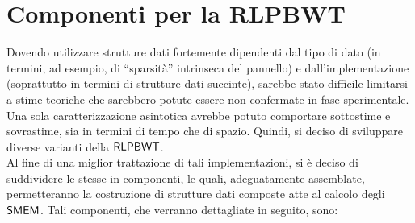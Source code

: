 \section{Componenti per la RLPBWT}
\label{sec:comp}
Dovendo utilizzare
strutture dati fortemente dipendenti dal tipo di dato (in termini, ad esempio,
di ``sparsità'' intrinseca del pannello) e dall'implementazione (soprattutto in
termini di strutture dati succinte), sarebbe stato difficile limitarsi a stime
teoriche che sarebbero potute essere non confermate in fase sperimentale. Una
sola caratterizzazione asintotica avrebbe potuto comportare sottostime e
sovrastime, sia in termini di tempo che di spazio. Quindi, si deciso di
sviluppare diverse varianti della $\mbox{\rm {\sf RLPBWT}}$.\\ 
Al fine di una miglior trattazione di tali implementazioni, si è deciso di
suddividere le stesse in componenti, le quali, adeguatamente
assemblate, permetteranno la costruzione di strutture dati composte atte al
calcolo degli $\mbox{\rm {\sf SMEM}}$. Tali componenti, che verranno dettagliate in seguito,
sono: 
